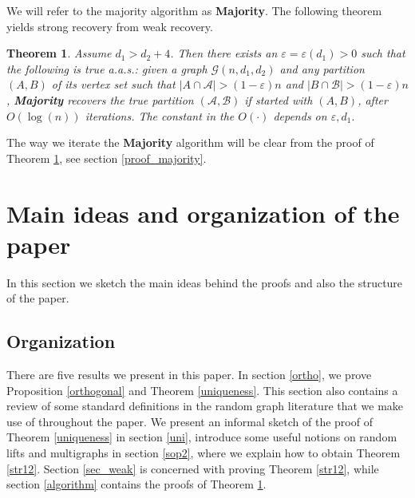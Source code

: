 \documentclass[11pt,reqno]{amsart}
\newcommand{\e}{\varepsilon}
\newtheorem{theorem}{Theorem}
\begin{document}
We will refer to the majority algorithm as \textbf{Majority}.
The following theorem yields strong recovery from weak recovery. %

 \begin{theorem}\label{majority} Assume $d_1>d_2+4$.  Then there
   exists an $\e=\e(d_1)>0$  such that the following is true a.a.s.:
   given a graph $\mathcal{G}(n,d_1,d_2)$ and any partition $(A,B)$
   of its vertex set such that $|A\cap \mathcal{A}|>(1-\e) n$ and
   $|B\cap \mathcal{B}|>(1-\e) n$, \textbf{Majority} recovers the true
   partition $(\mathcal{A}, \mathcal{B})$ if started with $(A,B)$,
   after $O(\log(n))$ iterations. The constant in the $O(\cdot)$ depends on $\e, d_1.$
\end{theorem}

The way we iterate the \textbf{Majority} algorithm will be clear from the proof of Theorem \ref{majority}, see section \ref{proof_majority}.

\section{Main ideas and organization of the paper}\label{psk}

In this section we sketch the main ideas behind the proofs and also the structure of the paper.

\subsection{Organization}

There are five results we present in this paper. In section \ref{ortho}, we prove
Proposition \ref{orthogonal} and Theorem \ref{uniqueness}. This section also contains a review of some standard definitions in the random graph literature that we make use of throughout the paper. We present an informal sketch of the proof of Theorem \ref{uniqueness} in section \ref{uni}, introduce some useful notions on random lifts and multigraphs in section \ref{sop2}, where we explain how to obtain Theorem \ref{str12}. Section \ref{sec_weak}  is concerned with proving Theorem \ref{str12}, while section \ref{algorithm} contains the proofs of Theorem \ref{majority}.

\end{document}

